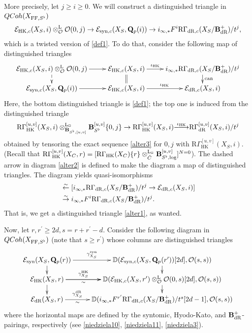 \documentclass[10pt,reqno]{amsart}
\theoremstyle{definition}
\theoremstyle{remark}
\def\lomapr#1{\smash{\mathop{\relbar\joinrel\longrightarrow}\limits^{#1}}}
\newcommand{\dr}{\operatorname{dR} }
\newcommand{\syn}{\operatorname{syn} }
\newcommand{\can}{ \operatorname{can} }
\newcommand{\synt}{ \operatorname{syn} }
\newcommand{\hk}{\operatorname{HK} }
\newcommand{\LL}{\operatorname{L} }
\newcommand{\FF}{\operatorname{FF} }
\newcommand{\so}{{\mathcal O}}
\newcommand{\se}{{\mathcal{E}}}
\numberwithin{equation}{section}
\def\R{{\mathrm R}}
\def\Q{{\bf Q}} \def\Z{{\bf Z}}
\numberwithin{equation}{section}
\begin{document}
 More precisely, let $j\geq i\geq 0$. We will construct a distinguished triangle in ${\rm QCoh}(X_{\FF,S^{\flat}})$
\begin{equation}\label{alter1}
 \se_{\hk,c}(X_S,i)\otimes^{\LL}_{\so}\so(0,j) \to \se_{\syn,c}(X_S,\Q_p(i))\to i_{\infty,*}F^i\R\Gamma_{\dr,c}(X_S/\B^+_{\dr})/t^j,
\end{equation}
which is a twisted version of \eqref{def1}. To do  that, consider the following map of distinguished triangles
\begin{equation}\label{alter2}
\xymatrix@R=4mm{
 \se_{\hk,c}(X_S,i)\otimes^{\LL}_{\so}\so(0,j) \ar[r] \ar@{-->}[d] & \se_{\hk,c}(X_S,i) \ar@{=}[d]  \ar[r]^-{\iota_{\hk}}& i_{\infty,*}\R\Gamma_{\dr,c}(X_S/\B^+_{\dr})/t^j\ar[d]^{\can}\\
\se_{\syn,c}(X_S,\Q_p(i))\ar[r] & \se_{\hk,c}(X_S,i) \ar[r]^{\iota_{\hk}}  & \se_{\dr,c}(X_S,i)
}
\end{equation}
Here,  the bottom distinguished  triangle is \eqref{def1}; the top one is induced from the distinguished triangle 
$$
 \R\Gamma_{\hk}^{{[u,v]}}(X_S,i)\otimes^{\LL_{\Box}}_{\B_{S^{\flat},[u,v]}}\B_{S^{\flat}}^{[u,v]}\{0,j\}\to \R\Gamma_{\hk}^{{[u,v]}}(X_S,i)\lomapr{\iota_{\hk}} \R\Gamma_{\dr}^{{[u,v]}}(X_S,i)/t^j
$$
obtained by tensoring the exact sequence \eqref{alter3} for $0,j$ with  $\R\Gamma_{\hk}^{{[u,v]}}(X_S,i)$.
(Recall that $\R\Gamma_{\hk}^{{[u,v]}}(X_C,r)=[\R\Gamma_{\hk}(X_C)\{r\}\otimes^{\LL_{\Box}}_{\breve{C}}
\B^{[u,v]}_{S^{\flat}, \log}]^{N=0}$). The dashed  arrow in  diagram \eqref{alter2} is defined to make the diagram  a map of distinguished triangles. 
The diagram yields   quasi-isomorphisms
\begin{align*}
[ \se_{\hk,c}(X_S,i)\otimes^{\LL}_{\so}\so(0,j) \to \se_{\syn,c}(X_S,\Q_p(i))][1] & \stackrel{\sim}{\leftarrow} [ i_{\infty,*}\R\Gamma_{\dr,c}(X_S/\B^+_{\dr})/t^j\to \se_{\dr,c}(X_S,i)]\\
 & \stackrel{\sim}{\to} i_{\infty,*}F^i\R\Gamma_{\dr,c}(X_S/\B^+_{\dr})/t^j.
\end{align*}
That is, we get a distinguished triangle \eqref{alter1}, as wanted.

    Now, let $r, r^{\prime}\geq 2d, s=r+r^{\prime}-d$. Consider   
the following diagram in ${\rm QCoh}(X_{\FF,S^{\flat}})$ (note that $s\geq r^{\prime}$)
whose columns are distinguished triangles
\begin{equation}\label{alter4}
\xymatrix@R=4mm{
\se_{\syn}(X_S,\Q_p(r))\ar[r]^-{\gamma^{\synt}_{X_S}}\ar[d] & {\mathbb D}(\se_{\syn,c}(X_S,\Q_p(r^{\prime}))[2d],\so(s,s))\ar[d]\\
 \se_{\hk}(X_S,r) \ar[d] \ar[r]^-{\gamma^{\hk}_{X_S}}_-{\sim} \ar[r] &{\mathbb D}( \se_{\hk,c}(X_S,r^{\prime})\otimes^{\LL}_{\so}\so(0,s)[2d],\so(s,s))   \ar[d]\\
 \se_{\dr}(X_S,r) \ar[r]^-{\gamma^{\dr}_{X_S}}_-{\sim} &{\mathbb D}( i_{\infty,*}F^{r^{\prime}}\R\Gamma_{\dr,c}(X_S/\B^+_{\dr})/t^s[2d-1], \so(s,s))
}
\end{equation}
where the horizontal maps are defined by the syntomic, Hyodo-Kato, and $\B^+_{\dr}$-pairings, 
respectively (see \eqref{niedziela10}, \eqref{niedziela11}, \eqref{niedziela3}). 
\end{document}
